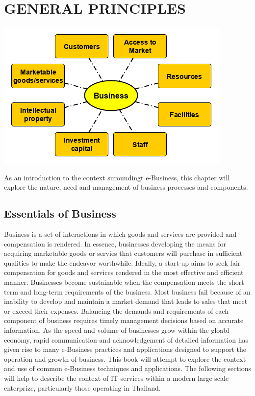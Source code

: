 \documentclass[]{book}
\begin{document}
\mainmatter

\hypertarget{general-principles}{%
\chapter{GENERAL PRINCIPLES}\label{general-principles}}

\begin{center}\includegraphics[width=0.9\linewidth]{images/keybusinesscomponents} \end{center}

As an introduction to the context suroundingt e-Business, this chapter will explore the nature, need and management of business processes and components.

\newpage

\hypertarget{essentials-of-business}{%
\section{Essentials of Business}\label{essentials-of-business}}

Business is a set of interactions in which goods and services are provided and compensation is rendered.
In essence, businesses developing the means for acquiring marketable goods or servies that customers will purchase in sufficient qualities to make the endeavor worthwhile. Ideally, a start-up aims to seek fair compensation for goods and services rendered in the most effective and efficient manner.
Businesses become sustainable when the compensation meets the short-term and long-term requirements of the business. Most business fail because of an inability to develop and maintain a market demand that leads to sales that meet or exceed their expenses. Balancing the demands and requirements of each component of business requires timely management decisions based on accurate information. As the speed and volume of businesses grow within the gloabl economy, rapid communication and acknowledgement of detailed information has given rise to many e-Business practices and applications designed to support the operation and growth of business. This book will attempt to explore the context and use of common e-Business techniques and applications. The following sections will help to describe the context of IT services within a modern large scale enterprize, particularly those operating in Thailand.
\end{document}
